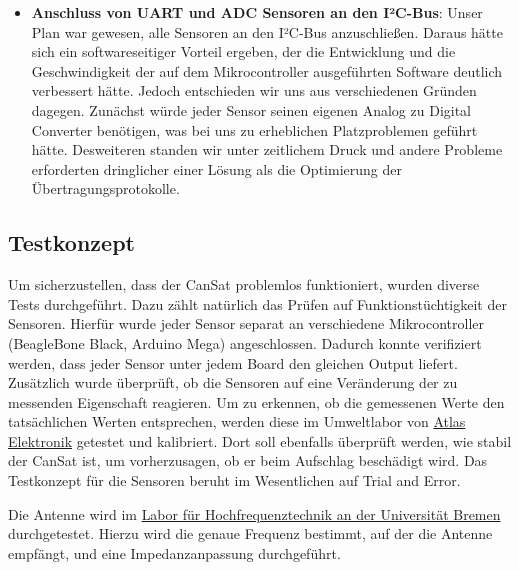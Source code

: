 \begin{itemize}
\item \textbf{Anschluss von UART und ADC Sensoren an den I²C-Bus}: Unser Plan war gewesen, alle Sensoren an den I²C-Bus anzuschließen. Daraus hätte sich ein softwareseitiger Vorteil ergeben, der die Entwicklung und die Geschwindigkeit der auf dem Mikrocontroller ausgeführten Software deutlich verbessert hätte. Jedoch entschieden wir uns aus verschiedenen Gründen dagegen. Zunächst würde jeder Sensor seinen eigenen Analog zu Digital Converter benötigen, was bei uns zu erheblichen Platzproblemen geführt hätte. Desweiteren standen wir unter zeitlichem Druck und andere Probleme erforderten dringlicher einer Lösung als die Optimierung der Übertragungsprotokolle.
\end{itemize}

\subsection{Testkonzept}
Um sicherzustellen, dass der CanSat problemlos funktioniert, wurden diverse Tests durchgeführt. Dazu zählt natürlich das Prüfen auf Funktionstüchtigkeit der Sensoren. Hierfür wurde jeder Sensor separat an verschiedene Mikrocontroller (BeagleBone Black, Arduino Mega) angeschlossen. Dadurch konnte verifiziert werden, dass jeder Sensor unter jedem Board den gleichen Output liefert. Zusätzlich wurde überprüft, ob die Sensoren auf eine Veränderung der zu messenden Eigenschaft reagieren. Um zu erkennen, ob die gemessenen Werte den tatsächlichen Werten entsprechen, werden diese im Umweltlabor von \href{https://www.atlas-elektronik.com/atlas-elektronik/}{Atlas Elektronik} getestet und kalibriert. Dort soll ebenfalls überprüft werden, wie stabil der CanSat ist, um vorherzusagen, ob er beim Aufschlag beschädigt wird. Das Testkonzept für die Sensoren beruht im Wesentlichen auf Trial and Error.

Die Antenne wird im \href{http://www.hf.uni-bremen.de/start/}{Labor für Hochfrequenztechnik an der Universität Bremen} durchgetestet. Hierzu wird die genaue Frequenz bestimmt, auf der die Antenne empfängt, und eine Impedanzanpassung durchgeführt.


